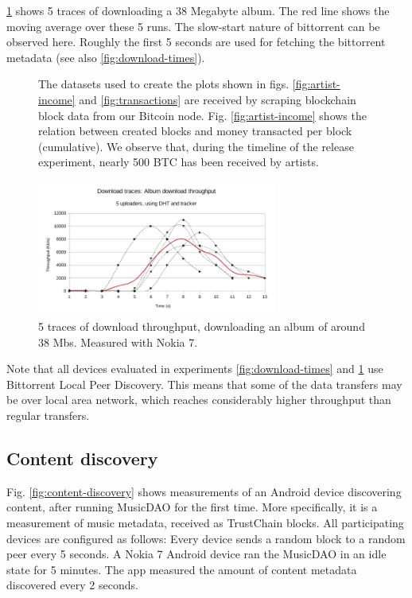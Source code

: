 \ref{fig:download-traces} shows 5 traces of downloading a 38 Megabyte album. The red line shows the moving average over these 5 runs. The slow-start nature of bittorrent can be observed here. Roughly the first 5 seconds are used for fetching the bittorrent metadata (see also \ref{fig:download-times}).
\begin{figure}
    The datasets used to create the plots shown in figs. \ref{fig:artist-income} and \ref{fig:transactions} are received by scraping blockchain block data from our Bitcoin node. Fig. \ref{fig:artist-income} shows the relation between created blocks and money transacted per block (cumulative). We observe that, during the timeline of the release experiment, nearly 500 BTC has been received by artists.

\centering
    \includegraphics[width=0.7\textwidth]{evaluation/download-traces.png}
    \caption{5 traces of download throughput, downloading an album of around 38 Mbs. Measured with Nokia 7.}
    \label{fig:download-traces}
\end{figure}

Note that all devices evaluated in experiments \ref{fig:download-times} and \ref{fig:download-traces} use Bittorrent Local Peer Discovery. This means that some of the data transfers may be over local area network, which reaches considerably higher throughput than regular transfers. 

\subsection{Content discovery}
Fig. \ref{fig:content-discovery} shows measurements of an Android device discovering content, after running MusicDAO for the first time. More specifically, it is a measurement of music metadata, received as TrustChain blocks. All participating devices are configured as follows: Every device sends a random block to a random peer every 5 seconds. A Nokia 7 Android device ran the MusicDAO in an idle state for 5 minutes. The app measured the amount of content metadata discovered every 2 seconds. 

